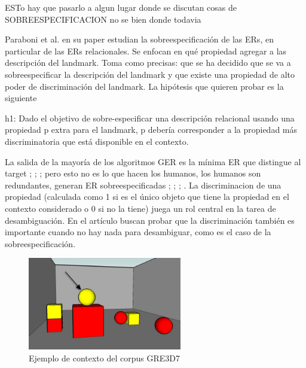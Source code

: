 ESTo hay que pasarlo a algun lugar donde se discutan cosas de SOBREESPECIFICACION no se bien donde todavia

Paraboni et al. en su paper \cite{acl-Paraboni15} estudian la sobreespecificaci\'on de las ERs, en particular de las ERs relacionales.
  Se enfocan en qu\'e propiedad agregar a las descripci\'on del landmark. Toma como precisas:
que se ha decidido que se va a sobreespecificar la descripci\'on del landmark
y que existe una propiedad de alto poder de discriminaci\'on del landmark.
La hip\'otesis que quieren probar es la siguiente

\begin{displayquote}h1: Dado el objetivo de sobre-especificar una descripci\'on relacional usando una propiedad p extra para el landmark, p deber\'ia corresponder a la propiedad m\'as discriminatoria que est\'a disponible en el contexto. 
\end{displayquote}
La salida de la mayor\'ia de los algoritmos GER es la m\'inima ER que distingue al target ; ; ; pero esto no es lo que hacen los humanos, los humanos son redundantes, generan ER sobreespecificadas ; ; ; . La discriminacion de una propiedad (calculada como 1 si es el \'unico objeto que tiene la propiedad en el contexto considerado o 0 si no la tiene) juega un rol central en la tarea de desambiguaci\'on. En el art\'iculo buscan probar que la discriminaci\'on tambi\'en es importante cuando no hay nada para desambiguar, como es el caso de la sobreespecificaci\'on.




\begin{figure}[ht]
\centering
\includegraphics[width=0.6\textwidth]{images/7.jpg}
\caption{Ejemplo de contexto del corpus GRE3D7}
\label{GRE3D7-stimulus7}
\end{figure}

